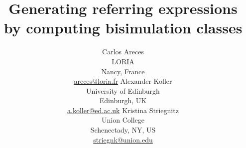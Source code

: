 \documentclass[11pt]{article}
\title{Generating referring expressions by computing bisimulation
  classes}
\author{Carlos Areces \\ LORIA \\ Nancy, France \\
  \url{areces@loria.fr}
\And
Alexander Koller \\ University of Edinburgh \\ Edinburgh, UK \\
\url{a.koller@ed.ac.uk}
\And
Kristina Striegnitz \\ Union College \\ Schenectady, NY, US \\
\url{striegnk@union.edu}
}
\date{}
\begin{document}
\maketitle

\cite{Dale1995}





\end{document}
